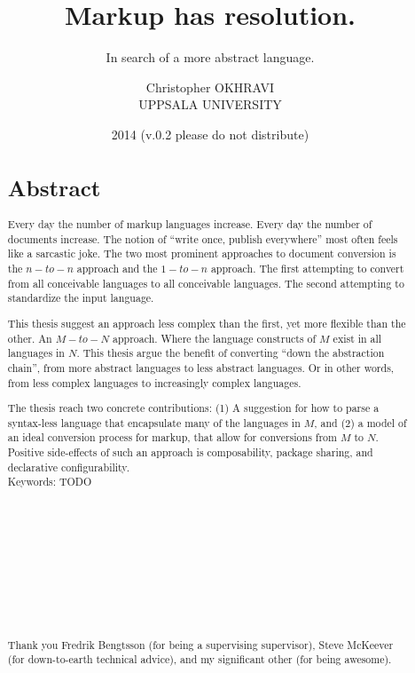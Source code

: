 \documentclass{scrreprt}
\date{2014 \smaller(v.0.2 please do not distribute)}
\title{ Markup has resolution. }
\subtitle{In search of a more abstract language.}
\author{ Christopher OKHRAVI \\ UPPSALA UNIVERSITY }
\begin{document}
\maketitle






%
%
%
%
%
%


\begin{abstract}
\section*{Abstract}
Every day the number of markup languages increase. Every day the number of documents increase. The notion of ``write once, publish everywhere'' most often feels like a sarcastic joke. The two most prominent approaches to document conversion is the $n-to-n$ approach and the $1-to-n$ approach. The first attempting to convert from all conceivable languages to all conceivable languages. The second attempting to standardize the input language.

This thesis suggest an approach less complex than the first, yet more flexible than the other. An $M-to-N$ approach. Where the language constructs of $M$ exist in all languages in $N$. This thesis argue the benefit of converting ``down the abstraction chain'', from more abstract languages to less abstract languages. Or in other words, from less complex languages to increasingly complex languages.

The thesis reach two concrete contributions: (1) A suggestion for how to parse a syntax-less language that encapsulate many of the languages in $M$, and (2) a model of an ideal conversion process for markup, that allow for conversions from $M$ to $N$. Positive side-effects of such an approach is composability, package sharing, and declarative configurability. \\


Keywords: TODO  \\ \\ \\ \\ \\ \\ \\ \\ \\ \\


\smaller
\paragraph{}
\noindent Thank you Fredrik Bengtsson (for being a supervising supervisor), 
Steve McKeever (for down-to-earth technical advice),
and my significant other (for being awesome).
\end{abstract}
\end{document}
